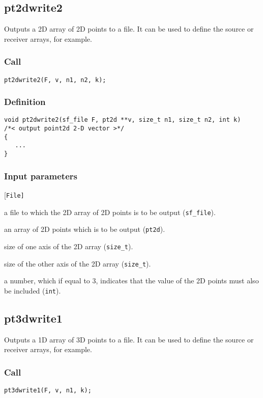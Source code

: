 \subsection{{pt2dwrite2}}
Outputs a 2D array of 2D points to a file. It can be used to define the source or receiver arrays, for example.

\subsubsection*{Call}
\begin{verbatim}pt2dwrite2(F, v, n1, n2, k);\end{verbatim}

\subsubsection*{Definition}
\begin{verbatim}
void pt2dwrite2(sf_file F, pt2d **v, size_t n1, size_t n2, int k)
/*< output point2d 2-D vector >*/
{
   ...
}
\end{verbatim}

\subsubsection*{Input parameters}
\begin{desclist}{\tt }{\quad}[\tt File]
   \setlength\itemsep{0pt}
   \item[File] a file to which the 2D array of 2D points is to be output (\texttt{sf\_file}). 
   \item[v]    an array of 2D points which is to be output (\texttt{pt2d}). 
   \item[n1]   size of one axis of the 2D array (\texttt{size\_t}).
   \item[n2]	   size of the other axis of the 2D array (\texttt{size\_t}). 
   \item[k]    a number, which if equal to 3, indicates that the value of the 2D points must also be included (\texttt{int}).     
\end{desclist}




\subsection{{pt3dwrite1}}
Outputs a 1D array of 3D points to a file. It can be used to define the source or receiver arrays, for example.

\subsubsection*{Call}
\begin{verbatim}pt3dwrite1(F, v, n1, k);\end{verbatim}

